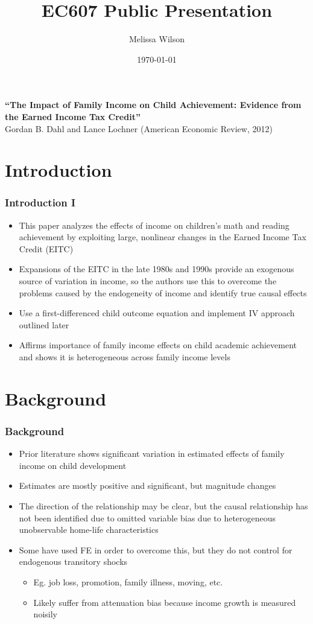 \documentclass{beamer}
\title{EC607 Public Presentation}
\author{Melissa Wilson}
\institute{University of Oregon}
\date{\today}
\begin{document}
\begin{frame}
\titlepage
\end{frame}

\begin{frame}
\frametitle{}
{\bf ``The Impact of Family Income on Child Achievement: Evidence from the Earned Income Tax Credit''} \\
Gordan B. Dahl and Lance Lochner (American Economic Review, 2012)
\end{frame}


\section{Introduction}


\begin{frame}
\frametitle{Introduction I}
\begin{itemize}
	\item This paper analyzes the effects of income on children's math and reading achievement by exploiting large, nonlinear changes in the Earned Income Tax Credit (EITC)
	\item Expansions of the EITC in the late 1980s and 1990s provide an exogenous source of variation in income, so the authors use this to overcome the problems caused by the endogeneity of income and identify true causal effects
	\item Use a first-differenced child outcome equation and implement IV approach outlined later
	\item Affirms importance of family income effects on child academic achievement and shows it is heterogeneous across family income levels
\end{itemize}
\end{frame}


\section{Background}


\begin{frame}
\frametitle{Background}
\begin{itemize}
	\item Prior literature shows significant variation in estimated effects of family income on child development
	\item Estimates are mostly positive and significant, but magnitude changes
	\item The direction of the relationship may be clear, but the causal relationship has not been identified due to omitted variable bias due to heterogeneous unobservable home-life characteristics 
	\item Some have used FE in order to overcome this, but they do not control for endogenous transitory shocks
	\begin{itemize}
		\item Eg. job loss, promotion, family illness, moving, etc.
		\item Likely suffer from attenuation bias because income growth is measured noisily
	\end{itemize} 
\end{itemize}
\end{frame}
\end{document}
